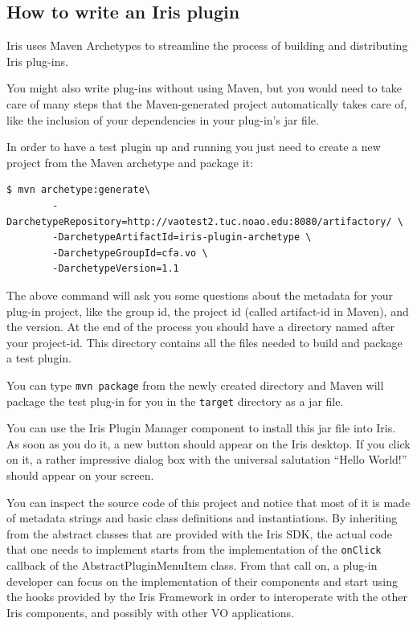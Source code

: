 \documentclass[preprint,12pt,3p]{elsarticle}
\begin{document}
\subsection{How to write an Iris plugin}
\label{sec:writeplugin}
Iris uses Maven Archetypes to streamline the process of building and distributing Iris plug-ins.

You might also write plug-ins without using Maven, but you would need to take care of many steps that the Maven-generated project automatically takes care of, like the inclusion of your dependencies in your plug-in's jar file.

In order to have a test plugin up and running you just need to create a new project from the Maven archetype and package it:
\begin{verbatim}
$ mvn archetype:generate\
        -DarchetypeRepository=http://vaotest2.tuc.noao.edu:8080/artifactory/ \
        -DarchetypeArtifactId=iris-plugin-archetype \
        -DarchetypeGroupId=cfa.vo \
        -DarchetypeVersion=1.1
\end{verbatim}

The above command will ask you some questions about the metadata for your plug-in project, like the group id, the project id (called artifact-id in Maven), and the version. At the end of the process you should have a directory named after your project-id. This directory contains all the files needed to build and package a test plugin.

You can type \verb|mvn package| from the newly created directory and Maven will package the test plug-in for you in the \verb|target| directory as a jar file.

You can use the Iris Plugin Manager component to install this jar file into Iris. As soon as you do it, a new button should appear on the Iris desktop. If you click on it, a rather impressive dialog box with the universal salutation ``Hello World!'' should appear on your screen.

You can inspect the source code of this project and notice that most of it is made of metadata strings and basic class definitions and instantiations. By inheriting from the abstract classes that are provided with the Iris SDK, the actual code that one needs to implement starts from the implementation of the \verb|onClick| callback of the AbstractPluginMenuItem class. From that call on, a plug-in developer can focus on the implementation of their components and start using the hooks provided by the Iris Framework in order to interoperate with the other Iris components, and possibly with other VO applications.
\end{document}
